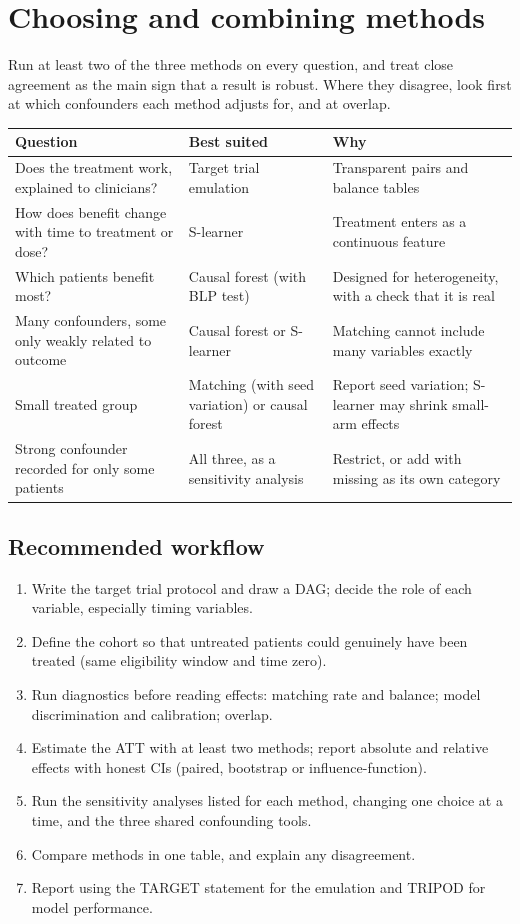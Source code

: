 \section{Choosing and combining methods}

Run at least two of the three methods on every question, and treat close agreement as the main sign that a result is robust. Where they disagree, look first at which confounders each method adjusts for, and at overlap.

\begin{xltabular}{\textwidth}{YL{3.6cm}Y}
\toprule
\textbf{Question} & \textbf{Best suited} & \textbf{Why} \\
\midrule
Does the treatment work, explained to clinicians? & Target trial emulation & Transparent pairs and balance tables \\
How does benefit change with time to treatment or dose? & S-learner & Treatment enters as a continuous feature \\
Which patients benefit most? & Causal forest (with BLP test) & Designed for heterogeneity, with a check that it is real \\
Many confounders, some only weakly related to outcome & Causal forest or S-learner & Matching cannot include many variables exactly \\
Small treated group & Matching (with seed variation) or causal forest & Report seed variation; S-learner may shrink small-arm effects \\
Strong confounder recorded for only some patients & All three, as a sensitivity analysis & Restrict, or add with missing as its own category \\
\bottomrule
\end{xltabular}

\subsection{Recommended workflow}

\begin{enumerate}
\item Write the target trial protocol and draw a DAG; decide the role of each variable, especially timing variables.
\item Define the cohort so that untreated patients could genuinely have been treated (same eligibility window and time zero).
\item Run diagnostics before reading effects: matching rate and balance; model discrimination and calibration; overlap.
\item Estimate the ATT with at least two methods; report absolute and relative effects with honest CIs (paired, bootstrap or influence-function).
\item Run the sensitivity analyses listed for each method, changing one choice at a time, and the three shared confounding tools.
\item Compare methods in one table, and explain any disagreement.
\item Report using the TARGET statement \cite{cashin2025} for the emulation and TRIPOD \cite{collins2015tripod} for model performance.
\end{enumerate}

